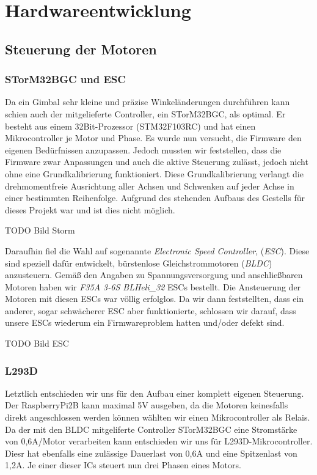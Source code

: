 \documentclass[12pt,a4paper,bibliography=totocnumbered,listof=totocnumbered]{scrartcl}
\begin{document}
\section{Hardwareentwicklung}
\subsection{Steuerung der Motoren}
\subsubsection{STorM32BGC und ESC}
Da ein Gimbal sehr kleine und präzise Winkeländerungen durchführen kann schien auch der mitgelieferte Controller, ein STorM32BGC, als optimal. Er besteht aus einem 32Bit-Prozessor (STM32F103RC) und hat einen Mikrocontroller je Motor und Phase. Es wurde nun versucht, die Firmware den eigenen Bedürfnissen anzupassen. Jedoch mussten wir feststellen, dass die Firmware zwar Anpassungen und auch die aktive Steuerung zulässt, jedoch nicht ohne eine Grundkalibrierung funktioniert. Diese Grundkalibrierung verlangt die drehmomentfreie Ausrichtung aller Achsen und Schwenken auf jeder Achse in einer bestimmten Reihenfolge. Aufgrund des stehenden Aufbaus des Gestells für dieses Projekt war und ist dies nicht möglich.

TODO Bild Storm

Daraufhin fiel die Wahl auf sogenannte \textit{Electronic Speed Controller}, (\textit{ESC}). Diese sind speziell dafür entwickelt, bürstenlose Gleichstrommotoren (\textit{BLDC}) anzusteuern. Gemäß den Angaben zu Spannungsversorgung und anschließbaren Motoren haben wir \textit{F35A 3-6S BLHeli\_32} ESCs bestellt. Die Ansteuerung der Motoren mit diesen ESCs war völlig erfolglos. Da wir dann feststellten, dass ein anderer, sogar schwächerer ESC aber funktionierte, schlossen wir darauf, dass unsere ESCs wiederum ein Firmwareproblem hatten und/oder defekt sind.

TODO Bild ESC

\subsubsection{L293D}
Letztlich entschieden wir uns für den Aufbau einer komplett eigenen Steuerung. Der RaspberryPi2B kann maximal 5V ausgeben, da die Motoren keinesfalls direkt angeschlossen werden können wählten wir einen Mikrocontroller als Relais. Da der mit den BLDC mitgeliferte Controller STorM32BGC eine Stromstärke von 0,6A/Motor verarbeiten kann entschieden wir uns für L293D-Mikrocontroller. Diesr hat ebenfalls eine zulässige Dauerlast von 0,6A und eine Spitzenlast von 1,2A. Je einer dieser ICs steuert nun drei Phasen eines Motors.
\end{document}
